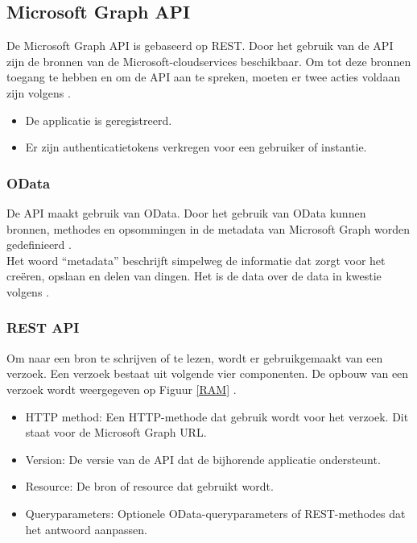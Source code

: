 \subsection{Microsoft Graph API}


De Microsoft Graph \Ac{API} is gebaseerd op \Ac{REST}. Door het gebruik van de \ac{API} zijn de bronnen van de Microsoft-cloudservices beschikbaar. Om tot deze bronnen toegang te hebben en om de \Ac{API} aan te spreken, moeten er twee acties voldaan zijn volgens \textcite{Microsoft2023vv}.

\begin{itemize}
    \item De applicatie is geregistreerd.
    \item Er zijn authenticatietokens verkregen voor een gebruiker of instantie.
\end{itemize}

\subsubsection{OData}


De \ac{API} maakt gebruik van OData. Door het gebruik van OData kunnen bronnen, methodes en opsommingen in de metadata van Microsoft Graph worden gedefinieerd \autocite{Microsoft2023vv}. \\

Het woord “metadata” beschrijft simpelweg de informatie dat zorgt voor het creëren, opslaan en delen van dingen. Het is de data over de data in kwestie volgens \textcite{Riley2017}.

\subsubsection{REST API}


Om naar een bron te schrijven of te lezen, wordt er gebruikgemaakt van een verzoek. Een verzoek bestaat uit volgende vier componenten. De opbouw van een verzoek wordt weergegeven op Figuur \ref{RAM} \autocite{Microsoft2023vv}.

\begin{itemize}
    \item \ac{HTTP} method: Een \ac{HTTP}-methode dat gebruik wordt voor het verzoek. Dit staat voor de Microsoft Graph \ac{URL}.
    \item Version: De versie van de \ac{API} dat de bijhorende applicatie ondersteunt.
    \item Resource: De bron of resource dat gebruikt wordt.
    \item Queryparameters: Optionele OData-queryparameters of \Ac{REST}-methodes dat het antwoord aanpassen.
\end{itemize}

